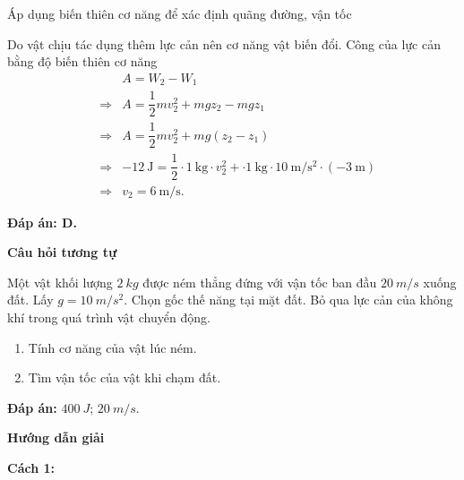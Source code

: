 \begin{dang}{Áp dụng biến thiên cơ năng để xác định quãng đường, vận tốc}
{		Do vật chịu tác dụng thêm lực cản nên cơ năng vật biến đổi. Công của lực cản bằng độ biến thiên cơ năng
		\begin{eqnarray*}
			&&A=W_2-W_1\\
			&\Rightarrow& A = \dfrac{1}{2}mv_2^2+mgz_2 - mgz_1\\
			&\Rightarrow& A= \dfrac{1}{2}mv_2^2+mg(z_2-z_1)\\
			&\Rightarrow& \SI{-12}{\joule} = \dfrac{1}{2}\cdot\SI{1}{\kilogram}\cdot v_2^2 + \cdot\SI{1}{\kilogram}\cdot \SI{10}{\meter/\second^2}\cdot(-\SI{3}{\meter})\\
			&\Rightarrow& v_2 = \SI{6}{\meter/\second}.
		\end{eqnarray*}
		
		\textbf{Đáp án: D.}
		
		\begin{center}
			\textbf{Câu hỏi tương tự}
		\end{center}
		
		Một vật khối lượng $\SI{2}{kg}$ được ném thẳng đứng với vận tốc ban đầu $\SI{20}{m/s}$ xuống đất. Lấy $g=\SI{10}{m/s^2}$. Chọn gốc thế năng tại mặt đất. Bỏ qua lực cản của không khí trong quá trình vật chuyển động.
		\begin{enumerate}[label=\alph*)]
			\item Tính cơ năng của vật lúc ném.
			\item Tìm vận tốc của vật khi chạm đất.
		\end{enumerate}
		
		\textbf{Đáp án:} $\SI{400}{J}$; $\SI{20}{m/s}$.
	}
	{	\begin{center}
			\textbf{Hướng dẫn giải}
		\end{center}
		
		\textbf{Cách 1:}
		
}
\end{dang}
